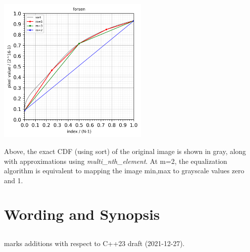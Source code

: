 \begin{center}
\includegraphics[width=0.55\textwidth]{plotting/examples/forsen_cdf_approximation.png}
\end{center}
Above, the exact CDF (using sort) of the original image is shown in gray, along with approximations using \emph{multi_nth_element}. At m=2, the equalization algorithm is equivalent to mapping the image min,max to grayscale values zero and 1.


\newpage
\section{Wording and Synopsis }
\label{synopsis}

\subsection{}

 marks additions with respect to C++23 draft (2021-12-27).

\renewcommand{\tref}[1]{ ref:\emph{#1}}
\renewcommand{\iref}[1]{ ref:\emph{#1}}

